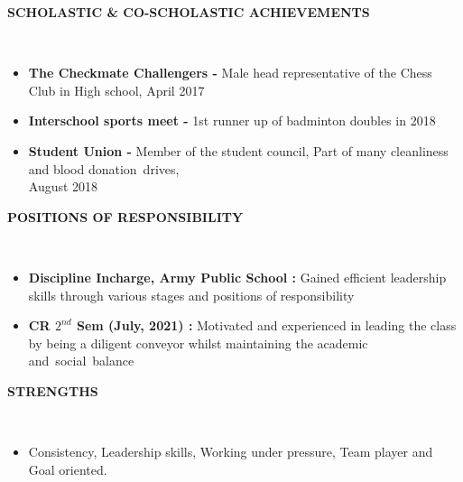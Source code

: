 \documentclass[a4paper,10pt]{article}
\newcommand{\lsep}{-0.5cm}
\newcommand{\resheading}[1]{{\small \colorbox{mygrey}{\begin{minipage}{0.975\textwidth}{\textbf{#1 \vphantom{p\^{E}}}}\end{minipage}}}}
\begin{document}
\resheading{\textbf{SCHOLASTIC \& CO-SCHOLASTIC ACHIEVEMENTS} }\\[\lsep]
\begin{itemize}
\setlength\itemsep{0em}
\item \noindent \textbf{The Checkmate Challengers - }Male head representative of the Chess Club in High school, April 2017
\item \noindent\textbf{Interschool sports meet - }1st runner up of badminton doubles in 2018
\item \noindent\textbf{Student Union - }Member of the student council, Part of many cleanliness and blood donation drives, \\ August 2018

\end{itemize}

\resheading{\textbf{POSITIONS OF RESPONSIBILITY} }\\[\lsep]
\begin{itemize}
\setlength\itemsep{0em}
\item \noindent \textbf{Discipline Incharge, Army Public School :} Gained efficient leadership skills through various stages and positions of responsibility
\item \noindent \textbf{CR ${2^{nd}}$ Sem (July, 2021) :}  Motivated and experienced in leading the class by being a diligent conveyor whilst maintaining the academic and social balance

\end{itemize}

\resheading{\textbf{STRENGTHS} }\\[\lsep]
\begin{itemize}
\setlength\itemsep{0em}
\item  Consistency, Leadership skills, Working under pressure, Team player and Goal oriented.

\end{itemize}
\end{document}
